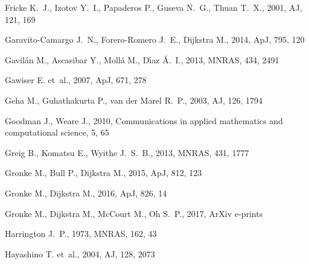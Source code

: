 \documentclass[a4,useAMS,usenatbib,usegraphicx]{mn2e}
\newcommand{\apj}{ApJ}
\newcommand{\aj}{AJ}
\newcommand{\mnras}{MNRAS}
\begin{document}
\begin{thebibliography}{}
{Fricke} K.~J.,  {Izotov} Y.~I.,  {Papaderos} P.,  {Guseva} N.~G.,    {Thuan}
  T.~X.,  2001, \aj, 121, 169

{Garavito-Camargo} J.~N.,  {Forero-Romero} J.~E.,    {Dijkstra} M.,  2014,
  \apj, 795, 120

{Gavil{\'a}n} M.,  {Ascasibar} Y.,  {Moll{\'a}} M.,    {D{\'{\i}}az} {\'A}.~I.,
   2013, \mnras, 434, 2491

{Gawiser} E.  et~al., 2007, \apj, 671, 278

{Geha} M.,  {Guhathakurta} P.,    {van der Marel} R.~P.,  2003, \aj, 126, 1794

Goodman J.,  Weare J.,  2010, Communications in applied mathematics and
  computational science, 5, 65

{Greig} B.,  {Komatsu} E.,    {Wyithe} J.~S.~B.,  2013, \mnras, 431, 1777

{Gronke} M.,  {Bull} P.,    {Dijkstra} M.,  2015, \apj, 812, 123

{Gronke} M.,  {Dijkstra} M.,  2016, \apj, 826, 14

{Gronke} M.,  {Dijkstra} M.,  {McCourt} M.,    {Oh} S.~P.,  2017, ArXiv
  e-prints

{Harrington} J.~P.,  1973, \mnras, 162, 43

{Hayashino} T.  et~al., 2004, \aj, 128, 2073


\end{thebibliography}
\end{document}
